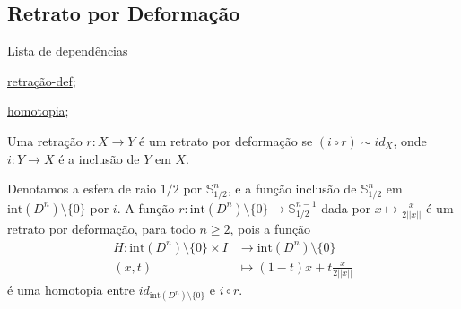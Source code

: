 \subsection{Retrato por Deformação}
\label{retrato-por-deformação-def}
\begin{titlemize}{Lista de dependências}
	\item \hyperref[retração-def]{retração-def};\\ %
	\item \hyperref[homotopia]{homotopia};\\
\end{titlemize}
\begin{defi}
	Uma retração $r:X \rightarrow Y$ é um retrato por deformação se $(i\circ r) \sim id_X$, onde $i:Y \rightarrow X$ é a inclusão de $Y$ em $X$.
\end{defi}
    \begin{ex}
    Denotamos a esfera de raio $1/2$ por $\mathbb{S}^n_{1/2}$, e a função inclusão de $\mathbb{S}^n_{1/2}$ em $\text{int}(D^n)\setminus\{0\}$ por $i$. A função $r:\text{int}(D^n)\setminus\{0\}\longrightarrow \mathbb{S}^{n-1}_{1/2} $ dada por $x\longmapsto \frac{x}{2||x||}$ é um retrato por deformação, para todo $n\ge 2$, pois a função
    \begin{align*}
        H:\text{int}(D^n)\setminus\{0\} \times I &\longrightarrow \text{int}(D^n)\setminus\{0\}\\
        (x,t)&\longmapsto (1-t)x+t\frac{x}{2||x||}
    \end{align*}
    é uma homotopia entre $id_{\text{int}(D^n)\setminus\{0\}}$ e $i\circ r$.
\end{ex}
